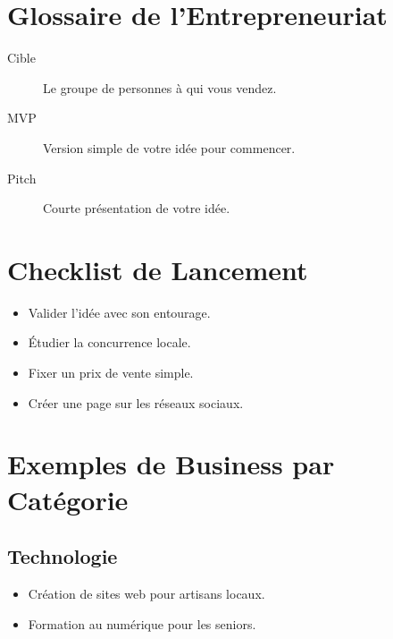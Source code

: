 \documentclass[12pt,a4paper]{report}
\begin{document}
\newpage

\chapter*{Glossaire de l'Entrepreneuriat}
\begin{description}
    \item[Cible] Le groupe de personnes à qui vous vendez.
    \item[MVP] Version simple de votre idée pour commencer.
    \item[Pitch] Courte présentation de votre idée.
\end{description}

\newpage

\chapter*{Checklist de Lancement}
\begin{itemize}
    \item[$\square$] Valider l'idée avec son entourage.
    \item[$\square$] Étudier la concurrence locale.
    \item[$\square$] Fixer un prix de vente simple.
    \item[$\square$] Créer une page sur les réseaux sociaux.
\end{itemize}

\newpage

\chapter*{Exemples de Business par Catégorie}
\section*{Technologie}
\begin{itemize}
    \item Création de sites web pour artisans locaux.
    \item Formation au numérique pour les seniors.
\end{itemize}
\end{document}
